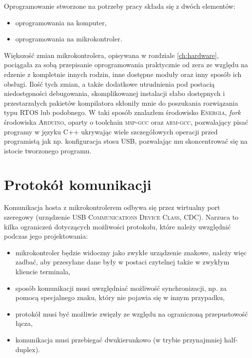 \label{ch:software}

Oprogramowanie stworzone na potrzeby pracy składa się z dwóch elementów:
\begin{itemize}
 \item oprogramowania na komputer,
 \item oprogramowania na mikrokontroler.\\
\end{itemize}

Większość zmian mikrokontrolera, opisywana w rozdziale \ref{ch:hardware}, pociągała za sobą przepisanie oprogramowania praktycznie od zera ze względu na rdzenie z kompletnie innych rodzin, inne dostępne moduły oraz inny sposób ich obsługi. Ilość tych zmian, a także dodatkowe utrudnienia pod postacią niedostępności debugowania, skomplikowanej instalacji słabo dostępnych i przestarzałych pakietów kompilatora skłoniły mnie do poszukania rozwiązania typu RTOS lub podobnego.
W taki sposób znalazłem środowisko \textsc{Energia}, \textit{fork} środowiska \textsc{Arduino}, oparty o toolchain \textsc{msp-gcc} oraz \textsc{arm-gcc}, pozwalający pisać programy w języku C++ ukrywając wiele szczegółowych operacji przed programistą jak np. konfiguracja stosu USB, pozwalając mu skoncentrować się na istocie tworzonego programu.\\

\section{Protokół komunikacji}

Komunikacja hosta z mikrokontrolerem odbywa się przez wirtualny port szeregowy (urządzenie \textsc{USB Communications Device Class, CDC}). Narzuca to kilka ograniczeń dotyczących możliwości protokołu, które należy uwzględnić podczas jego projektowania:
\begin{itemize}
 \item mikrokontroler będzie widoczny jako zwykłe urządzenie znakowe, należy więc zadbać, aby przesyłane dane były w postaci czytelnej także w zwykłym kliencie terminala,
 \item sposób komunikacji musi uwzględniać możliwość synchronizacji, np. za pomocą specjalnego znaku, który nie pojawia się w innym przypadku,
 \item protokół musi być możliwie zwięzły ze względu na ograniczoną przepustowość łącza,
 \item komunikacja musi przebiegać dwukierunkowo (w trybie przynajmniej half-duplex).\\
\end{itemize}

